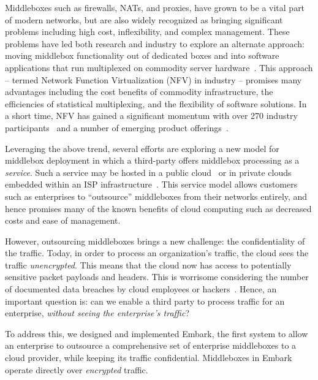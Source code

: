 \documentclass[letterpaper,twocolumn,10pt]{article}
\newcommand{\sys}{Embark\xspace} %
\newcommand{\etc}{{\it etc.}}
\providecommand{\DIFaddend}{} %
\begin{document}
\DIFaddend Middleboxes such as firewalls, NATs, and proxies, have grown to be a vital part of modern networks, but are 
also widely recognized as bringing significant problems including high cost, inflexibility, and complex management.  
These problems have led both research and industry to explore an alternate approach: moving middlebox functionality out of dedicated boxes and into 
software applications that run multiplexed on commodity server hardware~\cite{mb-manifesto,comb,aplomb,opennf,clickos,flowtags,etsi-nfv,domain20,opnfv}.
This approach -- termed Network Function Virtualization (NFV) in industry -- promises many advantages including the cost benefits of commodity infrastructure, 
the efficiencies of statistical multiplexing, and the flexibility of software solutions. 
In a short time, NFV has gained a significant momentum with over 270 industry participants~\cite{etsi-nfv} and a number of emerging product offerings~\cite{brocade,dell,juniper}.

Leveraging the above trend, several efforts are exploring a new model for middlebox deployment in which a third-party offers middlebox processing as a  
\emph{service}.
Such a service may be hosted in a public cloud~\cite{aplomb,zscaler,aryaka} or in private clouds embedded within an ISP 
infrastructure~\cite{domain20, telefonica}.  
This service model allows customers such as enterprises to ``outsource'' middleboxes from their networks entirely, and hence promises many of the known benefits of cloud computing  such as decreased costs and ease of management.%

However, outsourcing middleboxes brings a new challenge: the confidentiality of the traffic. 
Today, in order to process an organization's traffic, the cloud sees the traffic {\em unencrypted}.  This means that the cloud 
now has access to potentially sensitive packet payloads and headers. This is 
worrisome considering the number of documented data breaches by cloud employees or hackers~\cite{PrivacyRecords,databreach}.
Hence, an important question is: can we enable a third party to process traffic for an enterprise, {\em without seeing the enterprise's traffic}?

To address this, we designed and implemented \sys, the first system to allow an enterprise to outsource  a comprehensive set of enterprise middleboxes  to a cloud provider, while keeping its traffic confidential. 
Middleboxes in \sys operate directly over {\it encrypted} traffic. %
\end{document}
